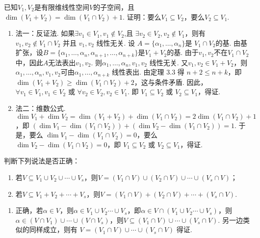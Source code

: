 \begin{exercise}
\begin{exgroup}
\begin{answer}
        \end{answer}

        \item 已知$V_1,V_2$是有限维线性空间$V$的子空间，且$\dim(V_1+V_2)=\dim(V_1 \cap V_2)+1$. 证明：要么$V_1 \subseteq V_2$，要么$V_2 \subseteq V_1$.

        \begin{answer}
            \begin{enumerate}
                \item 法一：反证法. 如果$\exists v_1\in V_1,v_1\not\in V_2$,且 $\exists v_2\in V_2,v_2\not\in V_1$，则有 $v_1,v_2\not \in V_1\cap V_2$ 并且 $v_1,v_2$ 线性无关. 设 $A=\{\alpha_1,\ldots ,\alpha_n\}$是 $V_1\cap V_2$的基. 由基扩张，设$B=\{\alpha_1,\ldots ,\alpha_n,\alpha_{n+1},\ldots ,\alpha_{n+k}\}$是$V_1+V_2$的基. 由于$v_1,v_2$不在$V_1\cap V_2$中，因此$A$无法表出$v_1,v_2$. 则$\alpha_1,\ldots ,\alpha_n,v_1,v_2$ 线性无关. 又$v_1,v_2\in V_1+V_2$，则$\alpha_1,\ldots ,\alpha_n,v_1,v_2$可由$\alpha_1,\ldots ,\alpha_{n+k}$ 线性表出. 由定理 $3.3$ 得 $n+2\leqslant n+k$，即 $\dim (V_1+V_2)\ge\dim (V_1\cap V_2)+2$，这与条件矛盾. 因此，$\forall v_1\in V_1,v_1\in V_2$ 或 $\forall v_2\in V_2,v_2\in V_1$. 即 $V_1\subseteq V_2$ 或 $V_2\subseteq V_1$，得证.

                \item 法二：维数公式. $\dim V_1+\dim V_2=\dim  (V_1+V_2)+\dim  (V_1\cap V_2)=2\dim  (V_1\cap V_2)+1$，即 $(\dim V_1-\dim  (V_1\cap V_2))+ (\dim V_2-\dim  (V_1\cap V_2))=1$. 于是，要么 $\dim V_1-\dim  (V_1\cap V_2)=0$，要么 $\dim V_2-\dim  (V_1\cap V_2)=0$，即 $V_1\subseteq V_2$ 或 $V_2\subseteq V_1$，得证.
            \end{enumerate}
        \end{answer}

        \item 判断下列说法是否正确：
        \begin{enumerate}
            \item 若$V \subseteq V_1 \cup V_2 \cup \cdots \cup V_s$，则$V=(V_1 \cap V)\cup(V_2 \cap V)\cup\cdots\cup(V_s \cap V)$；

            \item 若$V \subseteq V_1+V_2+\cdots +V_s$，则$V=(V_1 \cap V)+(V_2 \cap V)+\cdots+(V_s \cap V)$.
        \end{enumerate}
        \begin{answer}
          \begin{enumerate}
              \item 正确，若$\alpha\in V$，则$\alpha \in V_1\cup V_2\cdots \cup V_s$，即$\alpha \in V\cap (V_1\cup V_2\cdots \cup V_s)$，则$\alpha \in (V\cap V_1)\cup \cdots \cup (V\cap V_s)$，则$V\subseteq(V_1\cap V)\cup \cdots \cup (V_s\cap V)$. 另一边类似的同样成立，则有 $V=(V_1\cap V)\cup \cdots \cup (V_s\cap V)$ 得证.


\end{enumerate}
\end{answer}
\end{exgroup}
\end{exercise}
